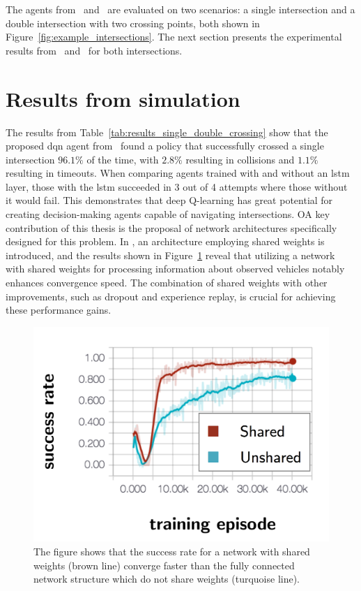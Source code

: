 The agents from \paperLSTM \ and \paperMPC \ are evaluated on two scenarios: a single intersection and a double intersection with two crossing points, both shown in Figure~\ref{fig:example_intersections}. The next section presents the experimental results from \paperLSTM \ and \paperMPC \ for both intersections.

\section{Results from simulation}
\label{sec:results_dqn}
The results from Table~\ref{tab:results_single_double_crossing} show that the proposed \gls{dqn} agent from \paperLSTM \ found a policy that successfully crossed a single intersection $96.1\%$ of the time, with $2.8\%$ resulting in collisions and $1.1\%$ resulting in timeouts. 
When comparing agents trained with and without an \gls{lstm} layer, those with the \gls{lstm} succeeded in 3 out of 4 attempts where those without it would fail.
This demonstrates that deep Q-learning has great potential for creating decision-making agents capable of navigating intersections. OA key contribution of this thesis is the proposal of network architectures specifically designed for this problem. In \paperLSTM, an architecture employing shared weights is introduced, and the results shown in Figure~\ref{fig:results_shared} reveal that utilizing a network with shared weights for processing information about observed vehicles notably enhances convergence speed. The combination of shared weights with other improvements, such as dropout and experience replay, is crucial for achieving these performance gains.


\begin{figure}[!ht]
	\centering
	\includegraphics[width=0.7\columnwidth]{YourThesis/papers/lstm/figures/results_shared.png}
	\caption{The figure shows that the success rate for a network with shared weights (brown line) converge faster than the fully connected network structure which do not share weights (turquoise line).}
	\label{fig:results_shared}
\end{figure}

